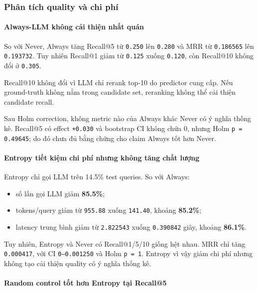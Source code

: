 \subsubsection*{Phân tích quality và chi phí}

\paragraph{Always-LLM không cải thiện nhất quán}

So với Never, Always tăng Recall@5 từ \texttt{0.250} lên \texttt{0.280} và MRR từ \texttt{0.186565} lên \texttt{0.193732}. Tuy nhiên Recall@1 giảm từ \texttt{0.125} xuống \texttt{0.120}, còn Recall@10 không đổi ở \texttt{0.305}.

Recall@10 không đổi vì LLM chỉ rerank top-10 do predictor cung cấp. Nếu ground-truth không nằm trong candidate set, reranking không thể cải thiện candidate recall.

Sau Holm correction, không metric nào của Always khác Never có ý nghĩa thống kê. Recall@5 có effect \texttt{+0.030} và bootstrap CI không chứa 0, nhưng Holm \texttt{p = 0.49645}; do đó chưa đủ bằng chứng cho claim Always tốt hơn Never.

\paragraph{Entropy tiết kiệm chi phí nhưng không tăng chất lượng}

Entropy chỉ gọi LLM trên 14.5\% test queries. So với Always:

\begin{itemize}
\item số lần gọi LLM giảm \textbf{85.5\%};
\item tokens/query giảm từ \texttt{955.88} xuống \texttt{141.40}, khoảng \textbf{85.2\%};
\item latency trung bình giảm từ \texttt{2.822543} xuống \texttt{0.390842} giây, khoảng \textbf{86.1\%}.
\end{itemize}

Tuy nhiên, Entropy và Never có Recall@1/5/10 giống hệt nhau. MRR chỉ tăng \texttt{0.000417}, với CI \texttt{0--0.001250} và Holm \texttt{p = 1}. Entropy vì vậy giảm chi phí nhưng không tạo cải thiện quality có ý nghĩa thống kê.

\paragraph{Random control tốt hơn Entropy tại Recall@5}

